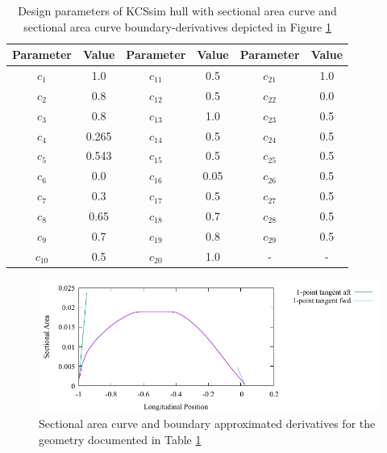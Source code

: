 \documentclass{report}
\begin{document}
\begin{table}[H]
    \centering
    \begin{tabular}{|c|c|c|c|c|c|}
        \hline 
        Parameter & Value & Parameter & Value & Parameter & Value\\
        \hline 
        $c_1$ & 1.0 & $c_{11}$ & 0.5 & $c_{21}$ & 1.0 \\
        \hline 
        $c_2$ & 0.8 & $c_{12}$ & 0.5 & $c_{22}$ & 0.0\\
        \hline 
        $c_3$ & 0.8 & $c_{13}$ & {\color{blue} 1.0} & $c_{23}$ & 0.5 \\
        \hline 
        $c_4$ & 0.265 & $c_{14}$ & 0.5 & $c_{24}$ & 0.5 \\
        \hline 
        $c_5$ & 0.543 & $c_{15}$ & 0.5 & $c_{25}$ & 0.5 \\
        \hline 
        $c_6$ & 0.0 & $c_{16}$ & 0.05 & $c_{26}$ & 0.5 \\
        \hline 
        $c_7$ & 0.3 & $c_{17}$ & 0.5 & $c_{27}$ & 0.5 \\
        \hline 
        $c_8$ & 0.65 & $c_{18}$ & 0.7 & $c_{28}$ & 0.5 \\
        \hline 
        $c_9$ & 0.7 & $c_{19}$ & 0.8 & $c_{29}$ & 0.5 \\
        \hline 
        $c_{10}$ & 0.5 & $c_{20}$ & 1.0 & - & - \\
        \hline 
    \end{tabular}
    \caption{Design parameters of KCSsim hull with sectional area curve and 
    sectional area curve boundary-derivatives depicted in Figure
    \ref{fig:test-4-sac-7}}
    \label{tab:test-4-7}
\end{table}
\begin{figure}[H]
    \centering
    \includegraphics[width = 0.7\linewidth]{figures/test-4-sac-7.pdf}
    \caption{Sectional area curve and boundary approximated derivatives for
    the geometry documented in Table \ref{tab:test-4-7}}
    \label{fig:test-4-sac-7}
\end{figure}
\end{document}

